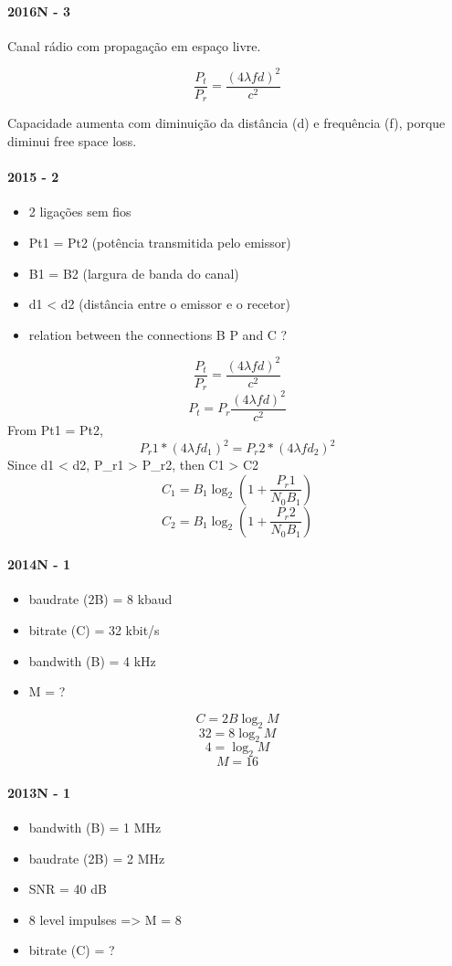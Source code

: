 \documentclass[../resumosRCOM.tex]{subfiles}
\begin{document}
\paragraph{2016N - 3}
Canal rádio com propagação em espaço livre.

\[\frac{P_t}{P_r}=\frac{(4\lambda fd)^2}{c^2}\]

Capacidade aumenta com diminuição da distância (d) e frequência (f), porque diminui free space loss.

\paragraph{2015 - 2}
\begin{itemize}
    \item 2 ligações sem fios
    \item Pt1 = Pt2 (potência transmitida pelo emissor)
    \item B1 = B2 (largura de banda do canal)
    \item d1 < d2 (distância entre o emissor e o recetor)
    \item relation between the connections B P and C ?
\end{itemize}

\[\frac{P_t}{P_r}=\frac{(4\lambda fd)^2}{c^2}\]
\[P_t=P_r\frac{(4\lambda fd)^2}{c^2}\]
From Pt1 = Pt2,
\[P_r1*(4\lambda fd_1)^2 = P_r2*(4\lambda fd_2)^2\]
Since d1 < d2, P\_r1 > P\_r2, then C1 > C2
\[C_1 = B_1\log_2 (1 + \frac{P_r1}{N_0B_1})\]
\[C_2 = B_1\log_2 (1 + \frac{P_r2}{N_0B_1})\]
\paragraph{2014N - 1}
\begin{itemize}
    \item baudrate (2B) = 8 kbaud
    \item bitrate (C) = 32 kbit/s
    \item bandwith (B) = 4 kHz
    \item M = ?
\end{itemize}

\[C = 2B\log_2 M\]
\[32 = 8\log_2 M\]
\[4 = \log_2 M\]
\[M = 16\]

\paragraph{2013N - 1}
\begin{itemize}
    \item bandwith (B) = 1 MHz
    \item baudrate (2B) = 2 MHz
    \item SNR = 40 dB
    \item 8 level impulses => M = 8
    \item bitrate (C) = ?
\end{itemize}
\end{document}
